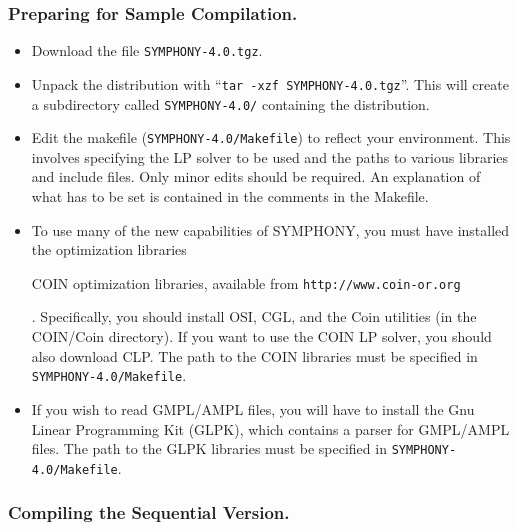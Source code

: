 \subsubsection{Preparing for Sample Compilation.}

\begin{itemize}

        \item Download the file {\tt SYMPHONY-4.0.tgz}.

        \item Unpack the distribution with ``{\tt tar -xzf
        SYMPHONY-4.0.tgz}''. This will create a subdirectory called
        {\tt SYMPHONY-4.0/} containing the distribution.
        
        \item Edit the makefile ({\tt SYMPHONY-4.0/Makefile}) to reflect your
              environment. This involves specifying the LP solver to be used
              and the paths to various libraries and include files. Only minor
              edits should be required. An explanation of what has to be set
              is contained in the comments in the Makefile. 

        \item To use many of the new capabilities of SYMPHONY, you must have
	      installed the
	      \emph{}
	      optimization libraries \begin{latexonly} COIN optimization
	      libraries, available from \texttt{http://www.coin-or.org}
	      \end{latexonly}.  Specifically, you should install OSI, CGL, and
	      the Coin utilities (in the COIN/Coin directory). If you want to
	      use the COIN LP solver, you should also download CLP.  The path
	      to the COIN libraries must be specified in
	      \texttt{SYMPHONY-4.0/Makefile}.

        \item If you wish to read GMPL/AMPL files, you will have to install
	      the Gnu Linear Programming Kit (GLPK), which contains a parser
	      for GMPL/AMPL files. The path to the GLPK libraries must be
	      specified in \texttt{SYMPHONY-4.0/Makefile}.

\end{itemize}
        
\subsubsection{Compiling the Sequential Version.}

